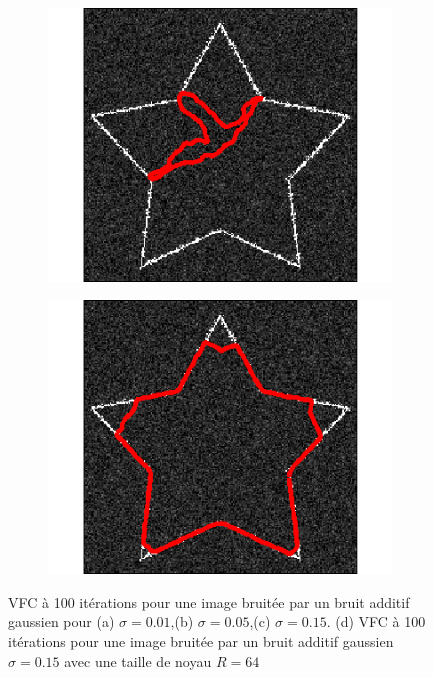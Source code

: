 \begin{figure}[H]
\begin{subfigure}[c]{0.3\linewidth}
\includegraphics[width=\textwidth]{Chapters/Images/Noise/vfcg15}
\caption{}
\end{subfigure}
\begin{subfigure}[c]{0.3\linewidth}
\centering
\includegraphics[width=\textwidth]{Chapters/Images/Noise/vfcsmallkernel}
\caption{}
\end{subfigure}
\caption{VFC à 100 itérations pour une image bruitée par un bruit additif gaussien pour (a) $\sigma = 0.01$,(b) $\sigma = 0.05$,(c) $\sigma = 0.15$. (d) VFC à 100 itérations pour une image bruitée par un bruit additif gaussien $\sigma=0.15$ avec une taille de noyau $R=64$}
\end{figure}

